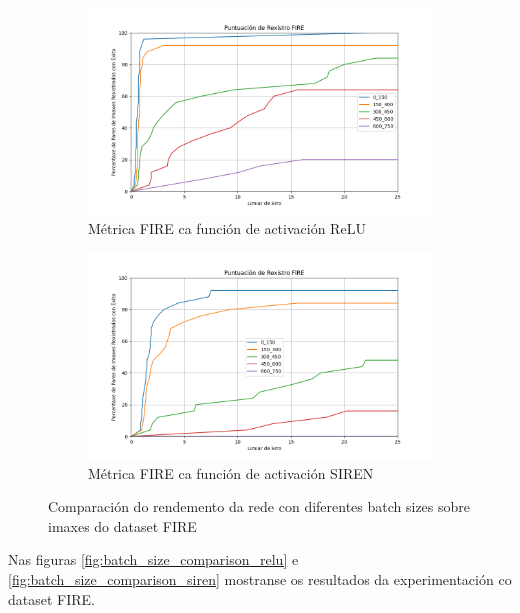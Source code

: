 \begin{figure}[ht]
    \centering
    \begin{subfigure}[b]{0.5\textwidth}
        \centering
        \includegraphics[width=\textwidth]{imaxes/FIRE_scores/fire_registration_scores_RFMID_MLP.png}
        \caption{Métrica FIRE ca función de activación ReLU}
        \label{fig:FIRERFMID_relu}
    \end{subfigure}\hfill
    \begin{subfigure}[b]{0.5\textwidth}
        \centering
        \includegraphics[width=\textwidth]{imaxes/FIRE_scores/fire_registration_scores_RMIFD_SIREN.png}
        \caption{Métrica FIRE ca función de activación SIREN}
        \label{fig:FIRERFMID_SIREN}
    \end{subfigure}
    \caption{Comparación do rendemento da rede con diferentes batch sizes sobre imaxes do dataset FIRE}
    \label{fig:FIRERFMID_scores}
\end{figure}


Nas figuras \ref{fig:batch_size_comparison_relu} e \ref{fig:batch_size_comparison_siren} mostranse os resultados da experimentación co dataset FIRE.

